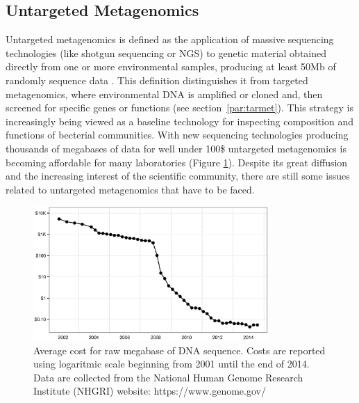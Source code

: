 \subsection{Untargeted Metagenomics}
Untargeted metagenomics is defined as the application of massive sequencing technologies (like shotgun sequencing or NGS) to genetic material obtained directly from one or more environmental samples, producing at least 50Mb of randomly sequence data \cite{kunin2008bioinformatician}. This definition distinguishes it from targeted metagenomics, where environmental DNA is amplified or cloned and, then screened for specific genes or functions (see section~\ref{par:tarmet}). This strategy is increasingly being viewed as a baseline technology for inspecting composition and functions of becterial communities. With new sequencing technologies producing thousands of megabases of data for well under 100\$ untargeted metagenomics is becoming affordable for many laboratories (Figure \ref{fig:seqcost}). Despite its great diffusion and the increasing interest of the scientific community, there are still some issues related to untargeted metagenomics that have to be faced.\\
\begin{figure}[!tb]
	\centering
	\includegraphics[width=0.8\textwidth]{./figures/Introduction/seq_cost}
  	\caption{Average cost for raw megabase of DNA sequence. Costs are reported using logaritmic scale beginning from 2001 until the end of 2014. Data are collected from the National Human Genome Research Institute (NHGRI) website: https://www.genome.gov/ \label{fig:seqcost}}
\end{figure}
